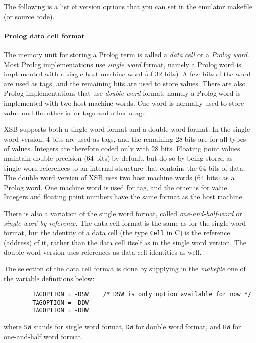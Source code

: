 \documentclass[11pt]{article}
\begin{document}
The following is a list of version options that you can set in the
emulator makefile (or source code).

\paragraph{Prolog data cell format. }
The memory unit for storing a Prolog term is called a {\it
data cell} or a {\it Prolog word}. Most Prolog implementations
use {\it single word} format, namely a Prolog word is implemented
with a single host machine word (of 32 bits). A few bits
of the word are used as tags, and the remaining bits are used
to store values. There are also Prolog implementations that use
{\it double word} format, namely a Prolog word is implemented
with two host machine words. One word is normally used to store 
value and the other is for tags and other usage.

XSB supports both a single word format and a double word
format.  In the single word version, 4 bits are used as tags, and the
remaining 28 bits are for all types of values. Integers are therefore coded only 
with 28 bits. Floating point values maintain double precision (64 bits) by defualt, 
but do so by being stored as single-word references to an internal structure that
contains the 64 bits of data. The double word version of XSB uses two host machine 
words (64 bits) as a Prolog word. One machine word is used for tag, and the other 
is for value. Integers and floating point numbers have the same format as the host
machine.

There is also a variation of the single word format, called {\it
one-and-half-word} or {\it single-word-by-reference}. 
The data cell format is the same as for the single word format,
but the identity of a data cell (the type {\tt Cell} in C) is the
reference (address) of it, rather than the data cell itself as in
the single word version. The double word version uses references
as data cell identities as well.

The selection of the data cell format is done by supplying 
in the {\it makefile} one of the variable definitions below:

\begin{verbatim}
        TAGOPTION = -DSW 	/* DSW is only option available for now */
        TAGOPTION = -DDW
        TAGOPTION = -DHW
\end{verbatim}

where {\tt SW} stands for single word format, {\tt DW} for double word
format, and {\tt HW} for one-and-half word format.
\end{document}

